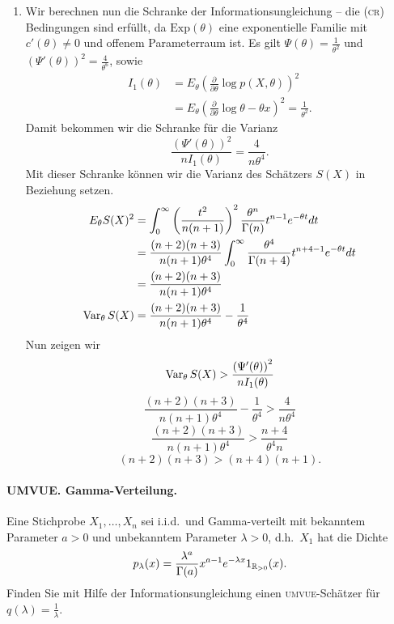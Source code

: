 \begin{enumerate}
    \item 
Wir berechnen nun die Schranke der Informationsungleichung -- die \textsc{(cr)}
Bedingungen sind erfüllt, da $\textrm{Exp}(\theta)$ eine exponentielle Familie
mit $c'(\theta)\neq 0$ und offenem Parameterraum ist. Es gilt
$\Psi(\theta)=\frac{1}{\theta^2}$ und $\left( \Psi'(\theta) \right)^2=
\frac{4}{\theta^6}$, sowie
\begin{align*}
    I_1(\theta) &= E_\theta \left( \frac{\partial}{\partial \theta} \log p(X, \theta) \right)^2 \\
    &= E_\theta \left( \frac{\partial}{\partial \theta} \log \theta -\theta x \right)^2 = \frac{1}{\theta^2}.
\end{align*}
Damit bekommen wir die Schranke für die Varianz
\begin{equation*}
    \frac{\left( \Psi'(\theta) \right)^2}{n I_1(\theta) } = \frac{4}{n \theta^4}.
\end{equation*}
Mit dieser Schranke können wir die Varianz des Schätzers $S(X)$ in Beziehung setzen.
\begin{align*}
    E_\theta S(X)^2 &= \int_{0}^{\infty} \left( \frac{t^2}{n(n+1)} \right)^2 \frac{\theta^n}{\Gamma(n)} t^{n-1} e^{-\theta t} dt \\
    &= \frac{(n+2)(n+3)}{n(n+1)\theta^4} \int_{0}^{\infty} \frac{\theta^4}{\Gamma(n+4)}t^{n+4-1} e^{-\theta t} dt \\
    &=  \frac{(n+2)(n+3)}{n(n+1)\theta^4} \\
    \operatorname{Var}_\theta S(X) &= \frac{(n+2)(n+3)}{n(n+1)\theta^4} - \frac{1}{\theta^4}
\end{align*}
Nun zeigen wir
\begin{equation*}
    \operatorname{Var}_\theta S(X) > \frac{\left( \Psi'(\theta) \right)^2}{n I_1(\theta) }
\end{equation*}
\begin{equation*}
    \frac{(n+2)(n+3)}{n(n+1)\theta^4} - \frac{1}{\theta^4} > \frac{4}{n \theta^4}
\end{equation*}
\begin{equation*}
    \frac{(n+2)(n+3)}{n(n+1)\theta^4} > \frac{n+4}{\theta^4 n}
\end{equation*}
\begin{equation*}
    (n+2)(n+3) > (n+4)(n+1).
\end{equation*}
\end{enumerate}






\paragraph{UMVUE. Gamma-Verteilung. } Eine Stichprobe $X_1, \ldots, X_n$ sei i.i.d.\
und Gamma-verteilt mit bekanntem Parameter $a>0$ und unbekanntem Parameter 
$\lambda>0$, d.h.\ $X_1$ hat die Dichte
\begin{equation*}
    p_\lambda (x) = \frac{\lambda^a}{\Gamma(a)} x^{a-1}e^{-\lambda x} 1_{\mathbb R_{>0}}(x).
\end{equation*}
Finden Sie mit Hilfe der Informationsungleichung einen \textsc{umvue}-Schätzer für
$q(\lambda) = \frac{1}{\lambda}$.

